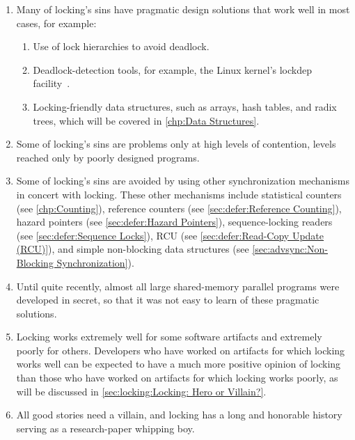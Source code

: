 \begin{enumerate}
\item	Many of locking's sins have pragmatic design solutions that
	work well in most cases, for example:
	\begin{enumerate}
	\item	Use of lock hierarchies to avoid deadlock.
	\item	Deadlock-detection tools, for example, the Linux kernel's
		lockdep facility~\cite{JonathanCorbet2006lockdep}.
	\item	Locking-friendly data structures, such as
		arrays, hash tables, and radix trees, which will
		be covered in \cref{chp:Data Structures}.
	\end{enumerate}
\item	Some of locking's sins are problems only at high levels of
	contention, levels reached only by poorly designed programs.
\item	Some of locking's sins are avoided by using other synchronization
	mechanisms in concert with locking.
	These other mechanisms include
	statistical counters
	(see \cref{chp:Counting}),
	reference counters
	(see \cref{sec:defer:Reference Counting}),
	hazard pointers
	(see \cref{sec:defer:Hazard Pointers}),
	sequence-locking readers
	(see \cref{sec:defer:Sequence Locks}),
	RCU
	(see \cref{sec:defer:Read-Copy Update (RCU)}),
	and simple non-blocking data structures
	(see \cref{sec:advsync:Non-Blocking Synchronization}).
\item	Until quite recently, almost all large shared-memory parallel
	programs were developed in secret, so that it was not easy
	to learn of these pragmatic solutions.
\item	Locking works extremely well for some software artifacts
	and extremely poorly for others.
	Developers who have worked on artifacts for which locking
	works well can be expected to have a much more positive
	opinion of locking than those who have worked on artifacts
	for which locking works poorly, as will be discussed in
	\cref{sec:locking:Locking: Hero or Villain?}.
\item	All good stories need a villain, and locking has a long and
	honorable history serving as a research-paper whipping boy.
\end{enumerate}

\QuickQuizEnd

